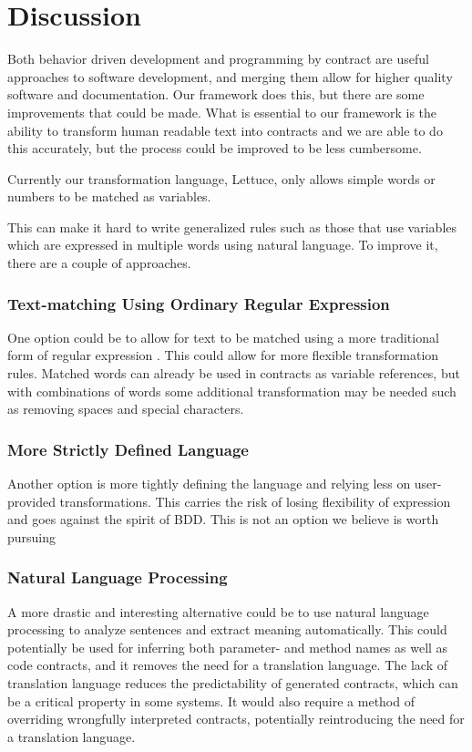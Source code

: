 \section{Discussion}
\label{sec:Discussion}
Both behavior driven development and programming by contract are useful approaches to software development, and merging them allow for higher quality software and documentation.
Our framework does this, but there are some improvements that could be made.
What is essential to our framework is the ability to transform human readable text into contracts and we are able to do this accurately, but the process could be improved to be less cumbersome.

Currently our transformation language, Lettuce, only allows simple words or numbers to be matched as variables.

This can make it hard to write generalized rules such as those that use variables which are expressed in multiple words using natural language.
To improve it, there are a couple of approaches.

\subsubsection{Text-matching Using Ordinary Regular Expression}
One option could be to allow for text to be matched using a more traditional form of regular expression \cite{thompson1968programming}.
This could allow for more flexible transformation rules.
Matched words can already be used in contracts as variable references, but with combinations of words some additional transformation may be needed such as removing spaces and special characters.

\subsubsection{More Strictly Defined Language}
Another option is more tightly defining the language and relying less on user-provided transformations.
This carries the risk of losing flexibility of expression and goes against the spirit of BDD.
This is not an option we believe is worth pursuing

\subsubsection{Natural Language Processing}
A more drastic and interesting alternative could be to use natural language processing \cite{jurafsky2002speech} to analyze sentences and extract meaning automatically.
This could potentially be used for inferring both parameter- and method names as well as code contracts, and it removes the need for a translation language.
The lack of translation language reduces the predictability of generated contracts, which can be a critical property in some systems.
It would also require a method of overriding wrongfully interpreted contracts, potentially reintroducing the need for a translation language.

